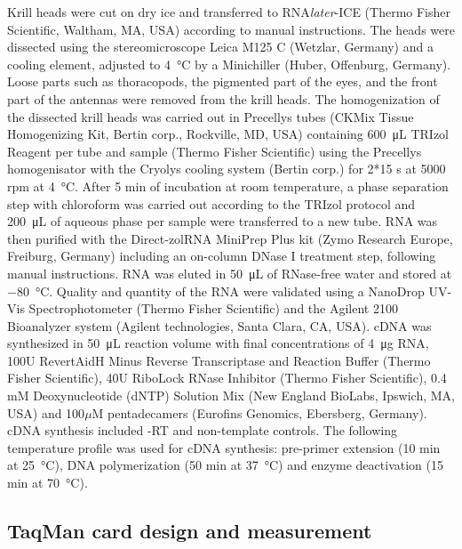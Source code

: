 Krill heads were cut on dry ice and transferred to
RNA\textit{later}\texttrademark-ICE (Thermo Fisher Scientific, Waltham, MA,
USA) according to manual instructions. The heads were dissected using the
stereomicroscope Leica M125 C (Wetzlar, Germany) and a cooling element,
adjusted to \SI{4}{\celsius} by a Minichiller (Huber, Offenburg, Germany).
Loose parts such as thoracopods, the pigmented part of the eyes, and the front
part of the antennas were removed from the krill heads. The homogenization of
the dissected krill heads was carried out in
Precellys\textsuperscript{\textregistered} tubes (CKMix Tissue Homogenizing
Kit, Bertin corp., Rockville, MD, USA) containing \SI{600}{\micro\liter} TRIzol\texttrademark
Reagent per tube and sample (Thermo Fisher Scientific) using the
Precellys\textsuperscript{\textregistered} homogenisator with the
Cryolys\textsuperscript{\textregistered} cooling system (Bertin corp.) for 2*15
s at 5000 rpm at \SI{4}{\celsius}. After 5 min of incubation at room temperature, a phase
separation step with chloroform was carried out according to the TRIzol
protocol and \SI{200}{\micro\liter} of aqueous phase per sample were transferred to a new tube.
RNA was then purified with the Direct-zol\texttrademark RNA MiniPrep Plus kit
(Zymo Research Europe, Freiburg, Germany) including an on-column DNase I
treatment step, following manual instructions. RNA was eluted in \SI{50}{\micro\liter} of
RNase-free water and stored at \SI{-80}{\celsius}.  Quality and quantity of the RNA were
validated using a NanoDrop UV-Vis Spectrophotometer (Thermo Fisher
Scientific) and the Agilent 2100 Bioanalyzer system (Agilent technologies,
Santa Clara, CA, USA).  cDNA was synthesized in \SI{50}{\micro\liter} reaction volume with
final concentrations of \SI{4}{\micro\gram} RNA, 100U RevertAid\texttrademark H Minus Reverse
Transcriptase and Reaction Buffer (Thermo Fisher Scientific), 40U RiboLock
RNase Inhibitor (Thermo Fisher Scientific), 0.4 mM Deoxynucleotide (dNTP)
Solution Mix (New England BioLabs, Ipswich, MA, USA) and 100$\mu$M pentadecamers
(Eurofins Genomics, Ebersberg, Germany). cDNA synthesis included -RT and
non-template controls. The following temperature profile was used for cDNA
synthesis: pre-primer extension (10 min at \SI{25}{\celsius}), DNA
polymerization (50 min at \SI{37}{\celsius}) and enzyme deactivation (15 min at
\SI{70}{\celsius}).

\subsection{TaqMan card design and measurement}

